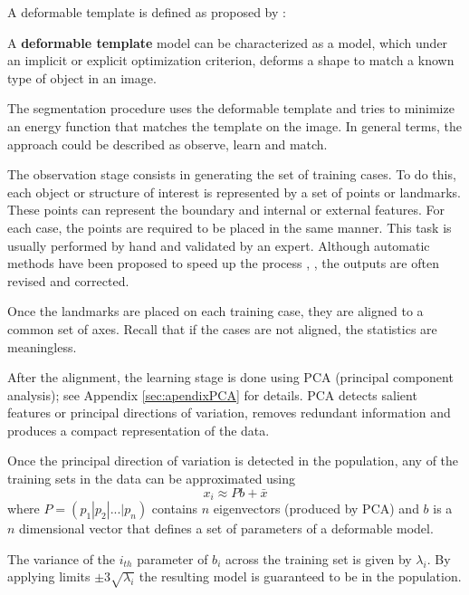 A deformable template is defined as proposed by \cite{fisker2000making}:

\begin{definition}
  A \textbf{deformable template} model can be characterized as a model, which under an implicit or explicit optimization
  criterion, deforms a shape to match a known type of object in an image. 
\end{definition}

The segmentation procedure uses the deformable template 
and tries to minimize an energy function that matches the template 
on the image.
In general terms, the approach could be described as observe, learn and match.

The observation stage consists in generating the set of 
training cases. To do this, each object or structure of interest is
represented by a set of points or landmarks. These points can represent
the boundary and internal or external features. 
For each case, the points are required to be 
placed in the same manner. This task 
is usually performed by hand and validated by an expert. 
Although automatic methods have been proposed to speed up the process \cite{hill2000framework}, \cite{heimann2007shape},
the outputs are often revised and corrected. 

Once the landmarks are placed on each training case, they are aligned to a common set of axes.
Recall that if the cases are not aligned, the statistics are meaningless.

After the alignment, the learning stage is done using PCA (principal component analysis); see Appendix \ref{sec:apendixPCA} for details.
PCA detects salient features or principal directions of variation,
removes redundant information and produces a compact representation of the data.

Once the principal direction of variation is detected in the population, 
any of the training sets in the data can be approximated using
\begin{equation}
 x_i \approx Pb + \bar{x}
 \label{equ:approxData}
\end{equation}
where $P = (p_1 |p_2 | . . . |p_n )$ contains $n$ eigenvectors (produced by PCA)
and $b$ is a $n$ dimensional vector that defines a set of 
parameters of a deformable model. 

The variance of the $i_{th}$ parameter of $b_i$ across the training set is given by $\lambda_i$. By applying limits
$\pm 3 \sqrt{\lambda_i}$ the resulting model is guaranteed to be in the population. 

